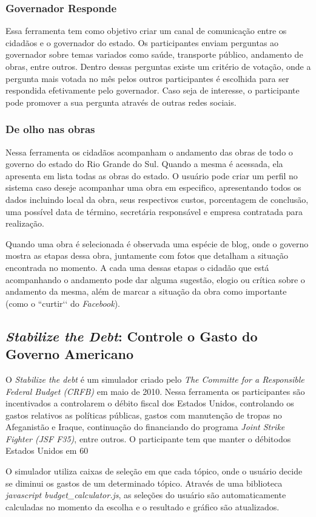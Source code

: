 \subsubsection*{Governador Responde}

Essa ferramenta tem como objetivo criar um canal de comunicação entre os cidadãos e o governador do estado. Os participantes enviam perguntas ao governador sobre temas variados como saúde, transporte público, andamento de obras, entre outros. Dentro dessas perguntas existe um critério de votação, onde a pergunta mais votada no mês pelos outros participantes é escolhida para ser respondida efetivamente pelo governador. Caso seja de interesse, o participante pode promover a sua pergunta através de outras redes sociais.
	
\subsubsection*{De olho nas obras}

Nessa ferramenta os cidadãos acompanham o andamento das obras de todo o governo do estado do Rio Grande do Sul. Quando a mesma é acessada, ela apresenta em lista todas as obras do estado. O usuário pode criar um perfil no sistema caso deseje acompanhar uma obra em especifico, apresentando todos os dados incluindo local da obra, seus respectivos custos, porcentagem de conclusão, uma possível data de término, secretária responsável e empresa contratada para realização.
	
Quando uma obra é selecionada é observada uma espécie de blog, onde o governo mostra as etapas dessa obra, juntamente com fotos que detalham a situação encontrada no momento. A cada uma dessas etapas o cidadão que está acompanhando o andamento pode dar alguma sugestão, elogio ou crítica sobre o andamento da mesma, além de marcar a situação da obra como importante (como o ``curtir‘‘  do \textit{Facebook}). 

\subsection{\textit{Stabilize the Debt}: Controle o Gasto do Governo Americano}

O \textit{Stabilize the debt} é um simulador criado pelo \textit{The Committe for a Responsible  Federal Budget  (CRFB)}  em  maio  de  2010.  Nessa  ferramenta  os  participantes  são  incentivados  a controlarem  o  débito  fiscal  dos  Estados  Unidos,  controlando  os  gastos  relativos  as  políticas públicas, gastos com manutenção de tropas no Afeganistão e Iraque, continuação do financiando do programa \textit{Joint Strike Fighter (JSF F35)}, entre outros. O participante tem que manter o débitodos Estados Unidos em 60%

O simulador utiliza caixas de seleção em que cada tópico, onde o usuário decide se diminui os gastos  de  um  determinado  tópico.  Através  de  uma  biblioteca  \textit{javascript  budget\_calculator.js},  as seleções do usuário são automaticamente calculadas no momento da escolha e o resultado e gráfico são atualizados.


